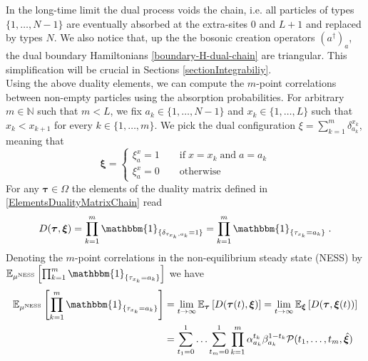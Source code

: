 \documentclass[10pt]{article}
\numberwithin{equation}{section}
\numberwithin{equation}{subsection}
\newcommand{\dt}{\;.}
\begin{document}
In the long-time limit the dual process voids the chain, i.e. all particles of types $\{1,\ldots,N-1\}$ are eventually absorbed at the extra-sites $0$ and $L+1$ and replaced by types $N$. We also notice that, up the the bosonic creation operators $(a^{\dagger})_{a}$, the dual boundary Hamiltonians \eqref{boundary-H-dual-chain} are triangular. This simplification will be crucial in Sections \ref{sectionIntegrabiliy}.\\

Using the above duality elements, we can compute the  $m$-point correlations between non-empty particles using the absorption probabilities. For arbitrary $m\in \mathbb{N}$ such that $m<L$, we fix $a_{k}\in\{1,\ldots,N-1\}$ and $x_{k}\in\{1,\ldots,L\}$ such that $x_{k}<x_{k+1}$ for every $k\in\{1,\ldots,m\}$. We pick the dual configuration $\xi=\sum_{k=1}^{m}\delta_{a_{k}}^{x_{k}}$, meaning that 
\begin{equation}
	\bm{\xi}=\begin{cases}
		\xi_{a}^{x}=1\qquad \text{if}\;x=x_{k}\;\text{and}\; a=a_{k}\\
		\xi_{a}^{x}=0\qquad \text{otherwise}
	\end{cases}
\end{equation}
For any $\bm{\tau}\in \Omega$ the elements of the duality matrix defined in \eqref{ElementsDualityMatrixChain} read
\begin{equation}
	D(\bm{\tau},\bm{\xi})=\prod_{k=1}^{m}\mathbbm{1}_{\{\delta_{\tau_{x_{k}},a_{k}}=1\}}=\prod_{k=1}^{m}\mathbbm{1}_{\{\tau_{x_{k}}=a_{k}\}}\dt
\end{equation}
Denoting the $m$-point correlations in the non-equilibrium steady state (NESS) by $\mathbb{E}_{\mu^{\text{NESS}}}\left[\prod_{k=1}^{m}\mathbbm{1}_{\{\tau_{x_{k}}=a_{k}\}}\right]$ we have 
\begin{equation}\label{CorrelationByABS-prob}
	\begin{split}
\mathbb{E}_{\mu^{\text{NESS}}}\left[\prod_{k=1}^{m}\mathbbm{1}_{\{\tau_{x_{k}}=a_{k}\}}\right]&=\lim_{t\to \infty}\mathbb{E}_{\bm{\tau}}\left[D(\bm{\tau}(t),\bm{{\xi}})\right]=\lim_{t\to \infty}\mathbb{E}_{\bm{\xi}}\left[D(\bm{\tau},\bm{{\xi}}(t))\right]
	\\&=\sum_{t_{1}=0}^{1}\ldots \sum_{t_{m}=0}^{1}\prod_{k=1}^{m}\alpha_{a_{k}}^{t_{k}}\beta_{a_{k}}^{1-t_{k}}\mathcal{P}(t_{1},\ldots,t_{m},\hat{\bm{\xi}})
\end{split}
\end{equation}
\end{document}
